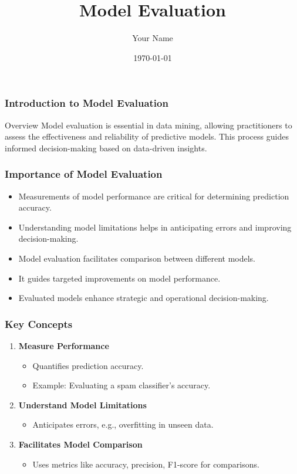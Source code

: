 \documentclass{beamer}
\title{Model Evaluation}
\author{Your Name}
\institute{Your Institution}
\date{\today}
\begin{document}
\frame{\titlepage}

\begin{frame}[fragile]
    \frametitle{Introduction to Model Evaluation}
    \begin{block}{Overview}
        Model evaluation is essential in data mining, allowing practitioners to assess the effectiveness and reliability of predictive models. This process guides informed decision-making based on data-driven insights.
    \end{block}
\end{frame}

\begin{frame}[fragile]
    \frametitle{Importance of Model Evaluation}
    \begin{itemize}
        \item Measurements of model performance are critical for determining prediction accuracy.
        \item Understanding model limitations helps in anticipating errors and improving decision-making.
        \item Model evaluation facilitates comparison between different models.
        \item It guides targeted improvements on model performance.
        \item Evaluated models enhance strategic and operational decision-making.
    \end{itemize}
\end{frame}

\begin{frame}[fragile]
    \frametitle{Key Concepts}
    \begin{enumerate}
        \item \textbf{Measure Performance}
            \begin{itemize}
                \item Quantifies prediction accuracy.
                \item Example: Evaluating a spam classifier's accuracy.
            \end{itemize}
        \item \textbf{Understand Model Limitations}
            \begin{itemize}
                \item Anticipates errors, e.g., overfitting in unseen data.
            \end{itemize}
        \item \textbf{Facilitates Model Comparison}
            \begin{itemize}
                \item Uses metrics like accuracy, precision, F1-score for comparisons.
            \end{itemize}
    \end{enumerate}
\end{frame}
\end{document}
